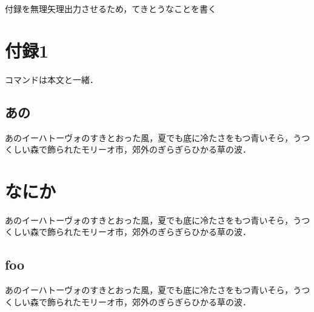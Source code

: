 付録を無理矢理出力させるため，てきとうなことを書く

\section{付録1}

コマンドは本文と一緒．

\subsection{あの}

あのイーハトーヴォのすきとおった風，夏でも底に冷たさをもつ青いそら，うつくしい森で飾られたモリーオ市，郊外のぎらぎらひかる草の波．

\section{なにか}

あのイーハトーヴォのすきとおった風，夏でも底に冷たさをもつ青いそら，うつくしい森で飾られたモリーオ市，郊外のぎらぎらひかる草の波．

\subsection{foo}

あのイーハトーヴォのすきとおった風，夏でも底に冷たさをもつ青いそら，うつくしい森で飾られたモリーオ市，郊外のぎらぎらひかる草の波．



